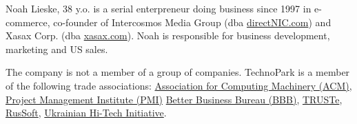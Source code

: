 Noah Lieske, 38 y.o.
is a serial enterpreneur doing business since 1997 in 
e-commerce, co-founder of Intercosmos Media Group (dba \href{http://www.directnic.com}{directNIC.com}) and 
Xasax Corp. (dba \href{http://www.xasax.com}{xasax.com}). Noah is responsible
for business development, marketing and US sales.

The company is not a member of a group of companies.
TechnoPark is a member of the following trade associations:
    \href{http://www.acm.org}{Association for Computing Machinery (ACM)},
    \href{http://www.pmi.org}{Project Management Institute (PMI)}
	\href{https://www.bbb.org/online/consumer/cks.aspx?ID=10805219819}{Better Business Bureau (BBB)},
	\href{http://www.truste.org/ivalidate.php?url=www.technoparkcorp.com&amp;sealid=101}{TRUSTe},
	\href{http://www.russoft.org}{RusSoft},
	\href{http://hi-tech.org.ua/Russian/about/members/index.html}{Ukrainian Hi-Tech Initiative}.
